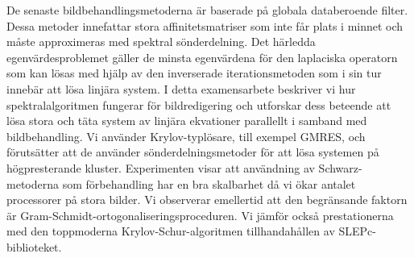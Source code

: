 De senaste bildbehandlingsmetoderna är baserade på globala databeroende filter.
Dessa metoder innefattar stora affinitetsmatriser som inte får plats i minnet och måste approximeras med spektral sönderdelning.
Det härledda egenvärdesproblemet gäller de minsta egenvärdena för den laplaciska operatorn som kan lösas med hjälp av den inverserade iterationsmetoden som i sin tur innebär att lösa linjära system.
I detta examensarbete beskriver vi hur spektralalgoritmen fungerar för bildredigering och utforskar dess beteende att lösa stora och täta system av linjära ekvationer parallellt i samband med bildbehandling.
Vi använder Krylov-typlösare, till exempel GMRES, och förutsätter att de använder sönderdelningsmetoder för att lösa systemen på högpresterande kluster.
Experimenten visar att användning av Schwarz-metoderna som förbehandling har en bra skalbarhet då vi ökar antalet processorer på stora bilder.
Vi observerar emellertid att den begränsande faktorn är Gram-Schmidt-ortogonaliseringsproceduren.
Vi jämför också prestationerna med den toppmoderna Krylov-Schur-algoritmen tillhandahållen av SLEPc-biblioteket.

